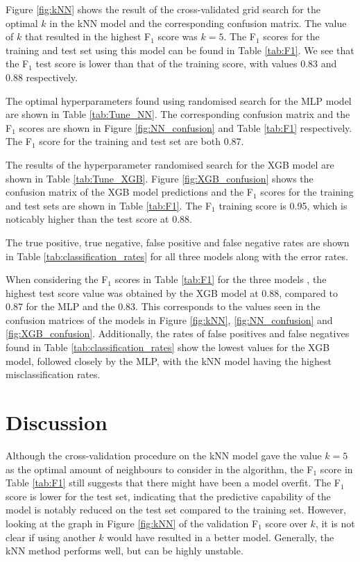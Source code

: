 \documentclass[a4paper, 11pt, twocolumn]{article}
\begin{document}
Figure \ref{fig:kNN} shows the result of the cross-validated grid search for the 
optimal $k$ in the kNN model and the corresponding confusion matrix. The value 
of $k$ that resulted in the highest F$_1$ score was $k=5$. The F$_1$ scores for 
the training and test set using this model can be found in Table \ref{tab:F1}.  
We see that the F$_1$ test score is lower than that of the training score, with 
values 0.83 and 0.88 respectively. 

The optimal hyperparameters found using randomised search for the MLP model are 
shown in Table \ref{tab:Tune_NN}. The corresponding confusion matrix and the 
F$_1$ scores are shown in Figure \ref{fig:NN_confusion} and Table \ref{tab:F1} 
respectively. The F$_1$ score for the training and test set are both 0.87. 

The results of the hyperparameter randomised search for the XGB model are shown 
in Table \ref{tab:Tune_XGB}. Figure \ref{fig:XGB_confusion} shows the confusion 
matrix of the XGB model predictions and the F$_1$ scores for the training and 
test sets are shown in Table \ref{tab:F1}. The F$_1$ training score is 0.95, 
which is noticably higher than the test score at 0.88. 

The true positive, true negative, false positive and false negative rates are 
shown in Table \ref{tab:classification_rates} for all three models along with 
the error rates. 

When considering the F$_1$ scores in Table \ref{tab:F1} for the three models , 
the highest test score value was obtained by the XGB model at 0.88, compared to 
0.87 for the MLP and the 0.83. This corresponds to the values seen in the 
confusion matrices of the models in Figure \ref{fig:kNN}, \ref{fig:NN_confusion} 
and \ref{fig:XGB_confusion}. Additionally, the rates of false positives and 
false negatives found in Table \ref{tab:classification_rates} show the lowest 
values for the XGB model, followed closely by the MLP, with the kNN model having 
the highest misclassification rates. 


\section{Discussion}
Although the cross-validation procedure on the kNN model gave the value $k=5$ as 
the optimal amount of neighbours to consider in the algorithm, the F$_1$ score 
in Table \ref{tab:F1} still suggests that there might have been a model overfit. 
The F$_1$ score is lower for the test set, indicating that the predictive 
capability of the model is notably reduced on the test set compared to the 
training set. However, looking at the graph in Figure \ref{fig:kNN} of the 
validation F$_1$ score over $k$, it is not clear if using another $k$ would have 
resulted in a better model. Generally, the kNN method performs well, but can be 
highly unstable. 
\end{document}
